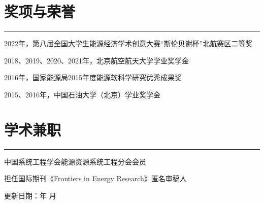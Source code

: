 \documentclass[letterpaper]{article}
\def\ftlink{http://llig.buaa.edu.cn/info/1017/1280.htm}
\renewcommand{\today}{\number\year 年 \number\month 月}
\renewenvironment{itemize}{
  \begin{list}{}{
    \setlength{\leftmargin}{0.2in}
    \setlength{\itemsep}{0.15in}
    \setlength{\parskip}{0.05in}
    \setlength{\parsep}{0.05in}
  }
}{
  \end{list}
}
\begin{document}

\section*{奖项与荣誉}
\hrule
\vspace{0.25cm}
  \begin{itemize}
    \item 2022年，第八届全国大学生能源经济学术创意大赛“斯伦贝谢杯”北航赛区二等奖
    \item 2018、2019、2020、2021年，北京航空航天大学学业奖学金
    \item 2016年，国家能源局2015年度能源软科学研究优秀成果奖
    \item 2015、2016年，中国石油大学（北京）学业奖学金
  \end{itemize}

\section*{学术兼职}
\hrule
\vspace{0.25cm}
  \begin{itemize}
    \item 中国系统工程学会能源资源系统工程分会会员
    \item 担任国际期刊《Frontiers in Energy Research》匿名审稿人
  \end{itemize}
\bigskip

\begin{flushright}
  \begin{footnotesize}
    更新日期：\today \\
  \end{footnotesize}
\end{flushright}
\end{document}
